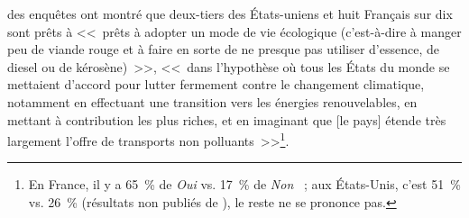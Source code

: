 des enquêtes ont montré que deux-tiers des États-uniens et huit Français sur dix sont prêts à <<~prêts à adopter un mode de vie écologique (c'est-à-dire à manger peu de viande rouge et à faire en sorte de ne presque pas utiliser d'essence, de diesel ou de
kérosène)~>>, <<~dans l'hypothèse où tous les États du monde se mettaient d'accord pour lutter fermement contre le changement climatique, notamment en effectuant une
transition vers les énergies renouvelables, en mettant à contribution les plus riches, et en imaginant que [le pays] étende très largement l'offre de transports non polluants~>>\footnote{En France, il y a 65~\% de \textit{Oui} vs. 17~\% de \textit{Non} \citep{douenne_french_2020}~; aux États-Unis, c'est 51~\% vs. 26~\% (résultats non publiés de \citealp{dechezlepretre_fighting_2022}), le reste ne se prononce pas.}.